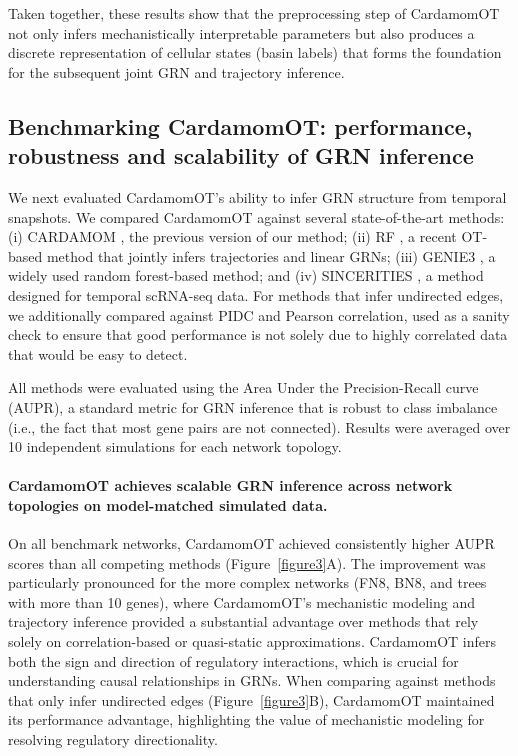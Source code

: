 \documentclass[a4paper, 11pt]{article}
\theoremstyle{plain}
\theoremstyle{remark}
\newcommand*{\firstreview}[1]{{\color{black}#1}}
\begin{document}
Taken together, these results show that the preprocessing step of CardamomOT not only infers mechanistically interpretable parameters but also produces a discrete representation of cellular states (basin labels) that forms the foundation for the subsequent joint GRN and trajectory inference.

\subsection{Benchmarking CardamomOT: performance, robustness and scalability of GRN inference}
\label{subsec:grn_inference_benchmark}

We next evaluated CardamomOT's ability to infer GRN structure from temporal snapshots. We compared CardamomOT against several state-of-the-art methods: (i) CARDAMOM \cite{ventre2023one}, the previous version of our method; (ii) RF \cite{zhang2024joint}, a recent \firstreview{OT}-based method that jointly infers trajectories and linear GRNs; (iii) GENIE3 \cite{huynh2010inferring}, a widely used random forest-based method; and (iv) SINCERITIES \cite{papili2018sincerities}, a method designed for temporal scRNA-seq data. For methods that infer undirected edges, we additionally compared against PIDC \cite{chan2017gene} and Pearson correlation, used as a sanity check to ensure that good performance is not solely due to highly correlated data that would be easy to detect.

All methods were evaluated using the Area Under the Precision-Recall curve (AUPR), a standard metric for GRN inference that is robust to class imbalance (i.e., the fact that most gene pairs are not connected). Results were averaged over 10 independent simulations for each network topology.

\paragraph{\firstreview{CardamomOT achieves scalable GRN inference across network topologies on model-matched simulated data.}}
On all benchmark networks, CardamomOT achieved consistently higher AUPR scores than all competing methods (Figure~\ref{figure3}A). The improvement was particularly pronounced for the more complex networks (FN8, BN8, and trees with more than 10 genes), where CardamomOT's mechanistic modeling and trajectory inference provided a substantial advantage over methods that rely solely on correlation-based or quasi-static approximations. CardamomOT infers both the sign and direction of regulatory interactions, which is crucial for understanding causal relationships in GRNs. When comparing against methods that only infer undirected edges (Figure~\ref{figure3}B), CardamomOT maintained its performance advantage, highlighting the value of mechanistic modeling for resolving regulatory directionality.
\end{document}

